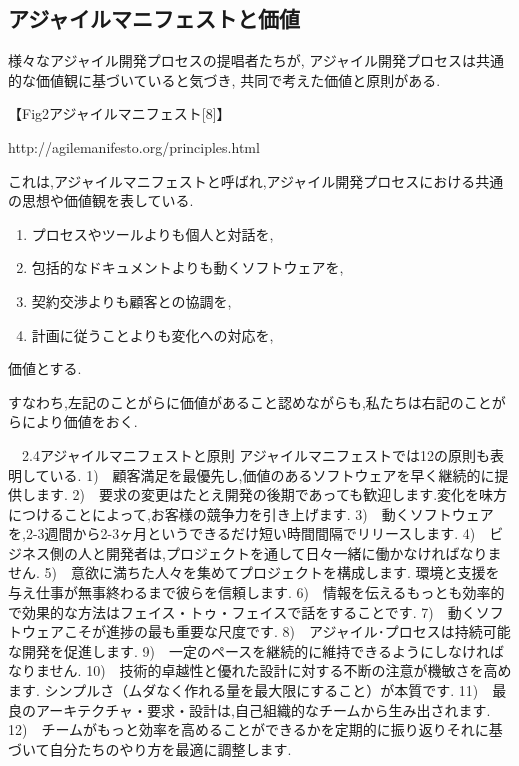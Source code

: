 \documentclass[paper]{jrsj}
\begin{document}
\subsection{アジャイルマニフェストと価値}
様々なアジャイル開発プロセスの提唱者たちが,
アジャイル開発プロセスは共通的な価値観に基づいていると気づき,
共同で考えた価値と原則がある.

【Fig2アジャイルマニフェスト[8]】
 
http://agilemanifesto.org/principles.html

これは,アジャイルマニフェストと呼ばれ,アジャイル開発プロセスにおける共通の思想や価値観を表している.

\begin{enumerate}
  \item プロセスやツールよりも個人と対話を,
  \item 包括的なドキュメントよりも動くソフトウェアを,
  \item 契約交渉よりも顧客との協調を,
  \item 計画に従うことよりも変化への対応を,    
\end{enumerate}

価値とする.

すなわち,左記のことがらに価値があること認めながらも,私たちは右記のことがらにより価値をおく.


　2.4アジャイルマニフェストと原則
アジャイルマニフェストでは12の原則も表明している.
1)　顧客満足を最優先し,価値のあるソフトウェアを早く継続的に提供します.
2)　要求の変更はたとえ開発の後期であっても歓迎します.変化を味方につけることによって,お客様の競争力を引き上げます.
3)　動くソフトウェアを,2-3週間から2-3ヶ月というできるだけ短い時間間隔でリリースします.
4)　ビジネス側の人と開発者は,プロジェクトを通して日々一緒に働かなければなりません.
5)　意欲に満ちた人々を集めてプロジェクトを構成します.
環境と支援を与え仕事が無事終わるまで彼らを信頼します.
6)　情報を伝えるもっとも効率的で効果的な方法はフェイス・トゥ・フェイスで話をすることです.
7)　動くソフトウェアこそが進捗の最も重要な尺度です.
8)　アジャイル･プロセスは持続可能な開発を促進します.
9)　一定のペースを継続的に維持できるようにしなければなりません.
10)　技術的卓越性と優れた設計に対する不断の注意が機敏さを高めます.
シンプルさ（ムダなく作れる量を最大限にすること）が本質です.
11)　最良のアーキテクチャ・要求・設計は,自己組織的なチームから生み出されます.
12)　チームがもっと効率を高めることができるかを定期的に振り返りそれに基づいて自分たちのやり方を最適に調整します.
\end{document}

